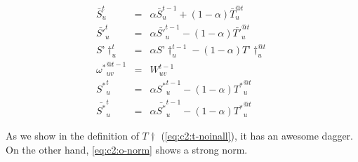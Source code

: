 \begin{eqnarray}
\label{eq:c2:s-byb}
\bar{S}_{u}^{t} & = & \alpha \bar{S}_{u}^{t-1}+(1-\alpha)\bar{T}_{u}^{@t} \\
\label{eq:c2:s-neg-byb}
\bar{S'}_{u}^{t} & = & \alpha \bar{S'}_{u}^{t-1}-(1-\alpha)\bar{T'}_{u}^{@t} \\
\label{eq:c2:s-neg-noinall}
S’\dagger_{u}^{t} & = & \alpha S’\dagger_{u}^{t-1}-(1-\alpha)T’\dagger_{u}^{@t} \\
\label{eq:c2:omega-justw}
{\omega^*}_{uv}^{@t-1} & = & W_{uv}^{t-1} \\
\label{eq:c2:s-justw}
{S^*}_{u}^{t} & = & \alpha {S^*}_{u}^{t-1}-(1-\alpha){T^*}_{u}^{@t} \\
\label{eq:c2:s-justw-byb}
\bar{S^*}_{u}^{t} & = & \alpha \bar{S^*}_{u}^{t-1}-(1-\alpha){T^*}_{u}^{@t}
\end{eqnarray}

As we show in the definition of $T\dagger$ (\ref{eq:c2:t-noinall}), it has an awesome dagger.  On the other hand, \ref{eq:c2:o-norm} shows a strong norm.
